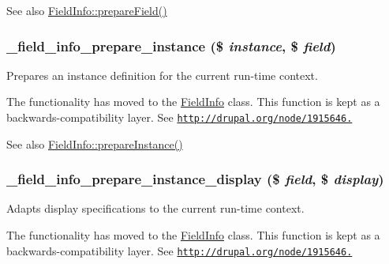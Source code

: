 \begin{DoxySeeAlso}{See also}
\hyperlink{classFieldInfo_a5fd135e121bf0e42cbb6a44e7a46a656}{FieldInfo::prepareField()} 
\end{DoxySeeAlso}
\hypertarget{group__field__info_ga8518b847132ddca82db418e588cdb88a}{
\subsubsection[{\_\-field\_\-info\_\-prepare\_\-instance}]{\setlength{\rightskip}{0pt plus 5cm}\_\-field\_\-info\_\-prepare\_\-instance (\$ {\em instance}, \/  \$ {\em field})}}
\label{group__field__info_ga8518b847132ddca82db418e588cdb88a}
Prepares an instance definition for the current run-\/time context.

The functionality has moved to the \hyperlink{classFieldInfo}{FieldInfo} class. This function is kept as a backwards-\/compatibility layer. See \href{http://drupal.org/node/1915646.}{\tt http://drupal.org/node/1915646.}

\begin{DoxySeeAlso}{See also}
\hyperlink{classFieldInfo_a1880ecc9614a0af5d46110a20f799ac7}{FieldInfo::prepareInstance()} 
\end{DoxySeeAlso}
\hypertarget{group__field__info_ga046dc640188fb6a51b904ce74e3194d0}{
\subsubsection[{\_\-field\_\-info\_\-prepare\_\-instance\_\-display}]{\setlength{\rightskip}{0pt plus 5cm}\_\-field\_\-info\_\-prepare\_\-instance\_\-display (\$ {\em field}, \/  \$ {\em display})}}
\label{group__field__info_ga046dc640188fb6a51b904ce74e3194d0}
Adapts display specifications to the current run-\/time context.

The functionality has moved to the \hyperlink{classFieldInfo}{FieldInfo} class. This function is kept as a backwards-\/compatibility layer. See \href{http://drupal.org/node/1915646.}{\tt http://drupal.org/node/1915646.}

